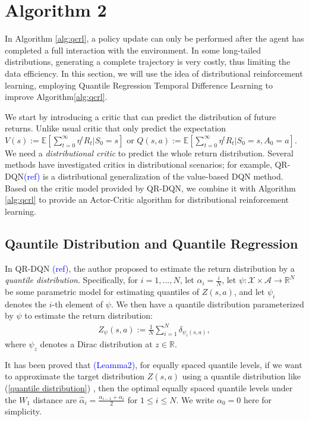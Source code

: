 \section{Algorithm 2}
In Algorithm \ref{alg:qcrl}, a policy update can only be performed after the agent has completed a full interaction with the environment. In some long-tailed distributions, generating a complete trajectory is very costly, thus limiting the data efficiency. In this section, we will use the idea of distributional reinforcement learning, employing Quantile Regression Temporal Difference Learning to improve Algorithm\ref{alg:qcrl}.

We start by introducing a critic that can predict the distribution of future returns. Unlike usual critic that only predict the expectation $V(s):=\mathbb{E}[\sum_{t=0}^{\infty}\eta^tR_{t}|S_0=s]$ or $Q(s,a):=\mathbb{E}[\sum_{t=0}^{\infty}\eta^tR_{t}|S_0=s,A_0=a]$. We need a \textit{distributional critic} to predict the whole return distribution. Several methods have investigated critics in distributional scenarios; for example, QR-DQN\textcolor{blue}{(ref)} is a distributional generalization of the value-based DQN method. Based on the critic model provided by QR-DQN, we combine it with Algorithm \ref{alg:qcrl} to provide an Actor-Critic algorithm for distributional reinforcement learning.

\subsection{Qauntile Distribution and Quantile Regression}
In QR-DQN \textcolor{blue}{(ref)}, the author proposed to estimate the return distribution by a \textit{quantile distribution}. Specifically, for $i=1,...,N$, let $\alpha_i=\frac{i}{N}$, let $\psi: \mathcal{X}\times\mathcal{A}\rightarrow\mathbb{R}^{N}$ be some parametric model for estimating quantiles of $Z(s,a)$, and let $\psi_i$ denotes the $i$-th element of $\psi$. We then have a quantile distribution parameterized by $\psi$ to estimate the return distribution:
\begin{align}\label{quantile distribution}
    Z_{\psi}(s,a):=\frac{1}{N}\sum_{i=1}^{N}\delta_{\psi_i(s,a)},
\end{align}
where $\psi_z$ denotes a Dirac distribution at $z\in\mathbb{R}$.

It has been proved that \textcolor{blue}{(Leamma2)}, for equally spaced quantile levels, if we want to approximate the target distribution $Z(s,a)$ using a quantile distribution like (\ref{quantile distribution}) , then the optimal equally spaced quantile levels under the $W_1$ distance are $\hat{\alpha}_i=\frac{\alpha_{i-1}+\alpha_i}{2}$ for $1\leq i\leq N$. We write $\alpha_0=0$ here for simplicity.

